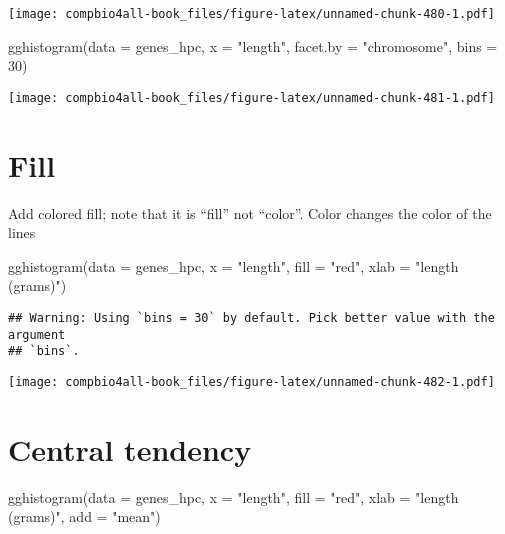 \documentclass[
]{book}
\newenvironment{Shaded}{\begin{snugshade}}{\end{snugshade}}
\newcommand{\AttributeTok}[1]{\textcolor[rgb]{0.77,0.63,0.00}{#1}}
\newcommand{\DecValTok}[1]{\textcolor[rgb]{0.00,0.00,0.81}{#1}}
\newcommand{\FunctionTok}[1]{\textcolor[rgb]{0.00,0.00,0.00}{#1}}
\newcommand{\NormalTok}[1]{#1}
\newcommand{\StringTok}[1]{\textcolor[rgb]{0.31,0.60,0.02}{#1}}
\begin{document}
\texttt{[image: compbio4all-book\_files/figure-latex/unnamed-chunk-480-1.pdf]}

\begin{Shaded}
\begin{Highlighting}[]
\FunctionTok{gghistogram}\NormalTok{(}\AttributeTok{data =}\NormalTok{ genes\_hpc,}
            \AttributeTok{x =} \StringTok{"length"}\NormalTok{,}
            \AttributeTok{facet.by =} \StringTok{"chromosome"}\NormalTok{,}
            \AttributeTok{bins =} \DecValTok{30}\NormalTok{)}
\end{Highlighting}
\end{Shaded}

\texttt{[image: compbio4all-book\_files/figure-latex/unnamed-chunk-481-1.pdf]}

\hypertarget{fill-1}{%
\section{Fill}\label{fill-1}}

Add colored fill; note that it is ``fill'' not ``color''. Color changes the color of the lines

\begin{Shaded}
\begin{Highlighting}[]
\FunctionTok{gghistogram}\NormalTok{(}\AttributeTok{data =}\NormalTok{ genes\_hpc,}
            \AttributeTok{x =} \StringTok{"length"}\NormalTok{,}
            \AttributeTok{fill =} \StringTok{"red"}\NormalTok{,}
            \AttributeTok{xlab =} \StringTok{"length (grams)"}\NormalTok{)}
\end{Highlighting}
\end{Shaded}

\begin{verbatim}
## Warning: Using `bins = 30` by default. Pick better value with the argument
## `bins`.
\end{verbatim}

\texttt{[image: compbio4all-book\_files/figure-latex/unnamed-chunk-482-1.pdf]}

\hypertarget{central-tendency-1}{%
\section{Central tendency}\label{central-tendency-1}}

\begin{Shaded}
\begin{Highlighting}[]
\FunctionTok{gghistogram}\NormalTok{(}\AttributeTok{data =}\NormalTok{ genes\_hpc,}
            \AttributeTok{x =} \StringTok{"length"}\NormalTok{,}
            \AttributeTok{fill =} \StringTok{"red"}\NormalTok{,}
            \AttributeTok{xlab =} \StringTok{"length (grams)"}\NormalTok{,}
            \AttributeTok{add =} \StringTok{"mean"}\NormalTok{)}
\end{Highlighting}
\end{Shaded}
\end{document}
